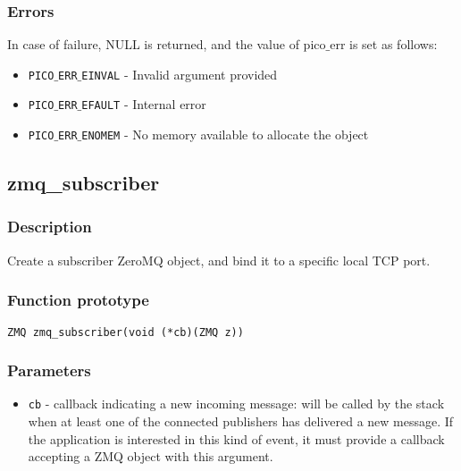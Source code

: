 \subsubsection*{Errors}
In case of failure, NULL is returned, and the value of pico$\_$err
is set as follows:

\begin{itemize}[noitemsep]
\item \texttt{PICO$\_$ERR$\_$EINVAL}          - Invalid argument provided
\item \texttt{PICO$\_$ERR$\_$EFAULT}          - Internal error
\item \texttt{PICO$\_$ERR$\_$ENOMEM}          - No memory available to allocate the object
\end{itemize}



\subsection{zmq\_subscriber}
\subsubsection*{Description}
Create a subscriber ZeroMQ object, and bind it to a specific local TCP port.

\subsubsection*{Function prototype}
\begin{verbatim}
ZMQ zmq_subscriber(void (*cb)(ZMQ z))
\end{verbatim}

\subsubsection*{Parameters}
\begin{itemize}[noitemsep]
\item \texttt{cb} - callback indicating a new incoming message: will be called by the stack when at least one of the connected publishers has delivered a new message. If the application is interested in this kind of event, it must provide a callback accepting a ZMQ object with this argument.
\end{itemize}


